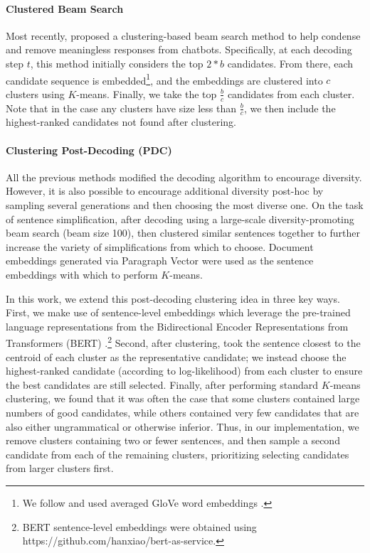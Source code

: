 \paragraph{Clustered Beam Search}\quad
Most recently, \citet{tam2019clustered} proposed a clustering-based beam search method to help condense and remove meaningless responses from chatbots.
Specifically, at each decoding step $t$, this method initially considers the top $2*b$ candidates. From there, each candidate sequence is embedded\footnote{We follow \citet{tam2019clustered} and used averaged GloVe word embeddings \cite{pennington2014glove}.}, and the embeddings are clustered into $c$ clusters using $K$-means. Finally, we take the top $\frac{b}{c}$ candidates from each cluster. Note that in the case any clusters have size less than $\frac{b}{c}$, we then include the highest-ranked candidates not found after clustering.

\paragraph{Clustering Post-Decoding (PDC)}
All the previous methods modified the decoding algorithm to encourage diversity.
However, it is also possible to encourage additional diversity post-hoc by sampling several generations and then choosing the most diverse one.
On the task of sentence simplification, after decoding using a large-scale diversity-promoting beam search (beam size 100), \citet{kriz2019complexity} then clustered similar sentences together to further increase the variety of simplifications from which to choose.
Document embeddings generated via Paragraph Vector \cite{Le2014distributed} were used as the sentence embeddings with which to perform $K$-means. 

In this work, we extend this post-decoding clustering idea in three key ways.
First, we make use of sentence-level embeddings which leverage the pre-trained language representations from the Bidirectional Encoder Representations from Transformers (BERT) \cite{devlin2018bert}.\footnote{BERT sentence-level embeddings were obtained using https://github.com/hanxiao/bert-as-service.}
Second, after clustering, \citet{kriz2019complexity} took the sentence closest to the centroid of each cluster as the representative candidate; we instead choose the highest-ranked candidate (according to log-likelihood) from each cluster to ensure the best candidates are still selected.
Finally, after performing standard $K$-means clustering, we found that it was often the case that some clusters contained large numbers of good candidates, while others contained very few candidates that are also either ungrammatical or otherwise inferior.
Thus, in our implementation, we remove clusters containing two or fewer sentences, and then sample a second candidate from each of the remaining clusters, prioritizing selecting candidates from larger clusters first.


